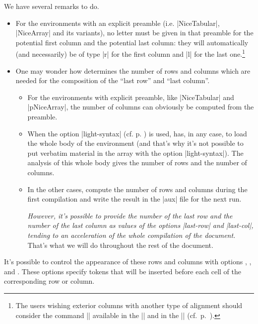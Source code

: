 \documentclass[dvipsnames]{article}%
\begin{document}
\bigskip
We have several remarks to do.
\begin{itemize}[beginpenalty=10000]
\item For the environments with an explicit preamble (i.e. |{NiceTabular}|,
|{NiceArray}| and its variants), no letter must be given in that preamble for
the potential first column and the potential last column: they will
automatically (and necessarily) be of type |r| for the first column and |l|
for the last one.\footnote{The users wishing exterior columns with another
type of alignment should consider the command |\SubMatrix| available in the
|\CodeAfter| and in the |\CodeBefore| (cf.~p.~\pageref{sub-matrix}).}
\item One may wonder how  determines the number of rows and
columns which are needed for the composition of the ``last row'' and ``last
column''.
\begin{itemize}
\item For the environments with explicit preamble, like |{NiceTabular}| and
|{pNiceArray}|, the number of columns can obviously be computed from the
preamble.

\item When the option |light-syntax| (cf. p. \pageref{light-syntax}) is used,
 has, in any case, to load the whole body of the environment
(and that's why it's not possible to put verbatim material in the array with
the option |light-syntax|). The analysis of this whole body gives the number
of rows and the number of columns.

\item In the other cases,  compute the number of rows and
columns during the first compilation and write the result in the |aux| file
for the next run.

\textsl{However, it's possible to provide the number of the last row and the
number of the last column as values of the options |last-row| and |last-col|,
tending to an acceleration of the whole compilation of the document.} That's
what we will do throughout the rest of the document.
\end{itemize}
\end{itemize}

\bigskip
{}
It's possible to control the appearance of these rows and columns with options
, ,
 and . These
options specify tokens that will be inserted before each cell of the
corresponding row or column.
\end{document}
